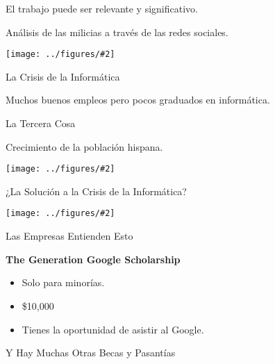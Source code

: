 \documentclass{beamer}
\newcommand{\fig}[2]{
  \texttt{[image: ../figures/\#2]}
}
\begin{document}
\begin{centering}
\begin{frame}[fragile]{El trabajo puede ser relevante y significativo.}
  
  {Análisis de las milicias a través de las redes sociales.}
  
  
  \vfill
  
  \fig{1.0}{saiph}
  
  
  
\end{frame}

\begin{frame}[fragile]{La Crisis de la Informática}
  
  {Muchos buenos empleos pero pocos graduados en informática.}
  
  \vfill
  
  
  
\end{frame}

\begin{frame}[fragile]{La Tercera Cosa}
  \pause
  
  Crecimiento de la población hispana.
  \vfill
  \fig{1.0}{hispanicpopgrowth}
\end{frame}


\begin{frame}[fragile]{¿La Solución a la Crisis de la Informática?}
  \pause
  

  
  \fig{1.0}{whitesdominate}
\end{frame}


\begin{frame}[fragile]{Las Empresas Entienden Esto}

  {\bf \Large The Generation Google Scholarship}

  \begin{itemize}
  \item Solo para minorías.
  \item \$10,000
  \item Tienes la oportunidad de asistir al Google.
  \end{itemize}

\end{frame}
\begin{frame}[fragile]{Y Hay Muchas Otras Becas y Pasantías}



\end{frame}
\end{centering}
\end{document}
